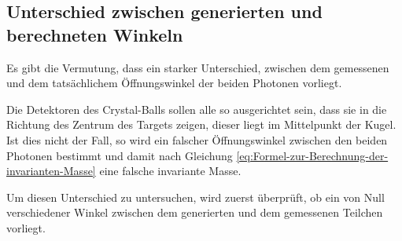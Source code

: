\documentclass[a4paper,11pt,oneside,final,german,openbib,pdftex]{scrbook}
\begin{document}
{%





\subsection{Unterschied zwischen generierten und berechneten Winkeln}
\label{sec:Unterschied-tatsaechlicher-gemessener-Winkel}

Es gibt die Vermutung, dass ein starker Unterschied, zwischen dem gemessenen und dem tatsächlichem Öffnungswinkel der beiden Photonen vorliegt.

Die Detektoren des Crystal-Balls sollen alle so ausgerichtet sein, dass sie in die Richtung des Zentrum des Targets zeigen, dieser liegt im Mittelpunkt der Kugel. Ist dies nicht der Fall, so wird ein falscher Öffnungswinkel zwischen den beiden Photonen bestimmt und damit nach Gleichung \ref{eq:Formel-zur-Berechnung-der-invarianten-Masse} eine falsche invariante Masse.

Um diesen Unterschied zu untersuchen, wird zuerst überprüft, ob ein von Null verschiedener Winkel zwischen dem generierten und dem gemessenen Teilchen vorliegt.

}
\end{document}
